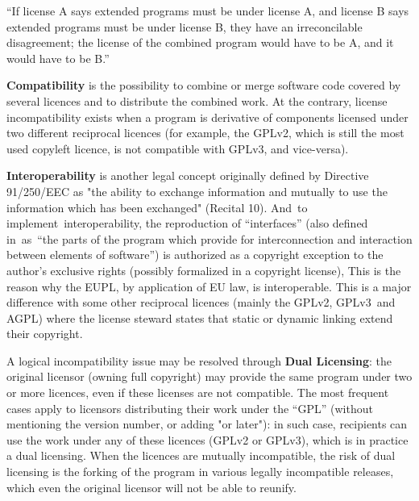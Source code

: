 \begin{displaycquote}
	``If license A says extended programs must be under license A, and license B
	says extended programs must be under license B, they have an irreconcilable
	disagreement; the license of the combined program would have to be A, and it
	would have to be B.''
\end{displaycquote}

\begin{flushleft}
	\textbf{Compatibility} is the possibility to combine or merge software code
	covered by several licences and to distribute the combined work. At the contrary,
	license incompatibility exists when a program is derivative of components licensed
	under two different reciprocal licences (for example, the GPLv2, which is still
	the most used copyleft licence, is not compatible with GPLv3, and vice-versa).
\end{flushleft}

\begin{flushleft}
	\textbf{Interoperability} is another legal concept originally defined by Directive
	91/250/EEC as "the ability to exchange information and mutually to use the
	information which has been exchanged" (Recital 10). And to implement interoperability,
	the reproduction of ``interfaces'' (also defined in as ``the parts of the program
	which provide for interconnection and interaction between elements of software'') is
	authorized as a copyright exception to the author's exclusive rights (possibly
	formalized in a copyright license), This is the reason why the EUPL, by application
	of EU law, is interoperable. This is a major difference with some other reciprocal
	licences (mainly the GPLv2, GPLv3 and AGPL) where the license steward states that
	static or dynamic linking extend their copyright.
\end{flushleft}

\begin{flushleft}
	A logical incompatibility issue may be resolved through \textbf{Dual Licensing}: the
	original licensor (owning full copyright) may provide the same program under two or
	more licences, even if these licenses are not compatible. The most frequent cases
	apply to licensors distributing their work under the ``GPL'' (without mentioning
	the version number, or adding "or later"): in such case, recipients can use the
	work under any of these licences (GPLv2 or GPLv3), which is in practice a dual
	licensing. When the licences are mutually incompatible, the risk of dual licensing
	is the forking of the program in various legally incompatible releases, which even
	the original licensor will not be able to reunify.
\end{flushleft}

